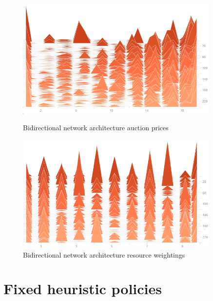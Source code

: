 \begin{figure}
    \centering
    \begin{minipage}{0.45\textwidth}
        \centering
        \includegraphics[width=0.9\textwidth]{figures/net_arch_training_fig/bidirectional_architecture_auction_prices.png}
        \caption{Bidirectional network architecture auction prices}
        \label{fig:bidirectional-auction-prices}
    \end{minipage}\hfill
    \begin{minipage}{0.45\textwidth}
        \centering
        \includegraphics[width=0.9\textwidth]{figures/net_arch_training_fig/bidirectional_architecture_weightings.png}
        \caption{Bidirectional network architecture resource weightings}
        \label{fig:bidirectional-resource-weightings}
    \end{minipage}
\end{figure}

\section{Fixed heuristic policies}\label{sec:fixed-heuristic-policies}
